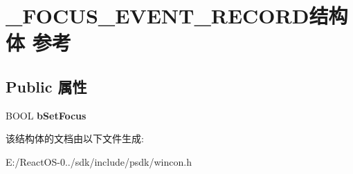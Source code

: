 \hypertarget{struct___f_o_c_u_s___e_v_e_n_t___r_e_c_o_r_d}{}\section{\+\_\+\+F\+O\+C\+U\+S\+\_\+\+E\+V\+E\+N\+T\+\_\+\+R\+E\+C\+O\+R\+D结构体 参考}
\label{struct___f_o_c_u_s___e_v_e_n_t___r_e_c_o_r_d}
\subsection*{Public 属性}
\begin{DoxyCompactItemize}
\item 
\mbox{\label{struct___f_o_c_u_s___e_v_e_n_t___r_e_c_o_r_d_ad24934fa23b787b1a588994991ef0cd6}} 
B\+O\+OL {\bfseries b\+Set\+Focus}
\end{DoxyCompactItemize}


该结构体的文档由以下文件生成\+:\begin{DoxyCompactItemize}
\item 
E\+:/\+React\+O\+S-\/0../sdk/include/psdk/wincon.\+h\end{DoxyCompactItemize}
